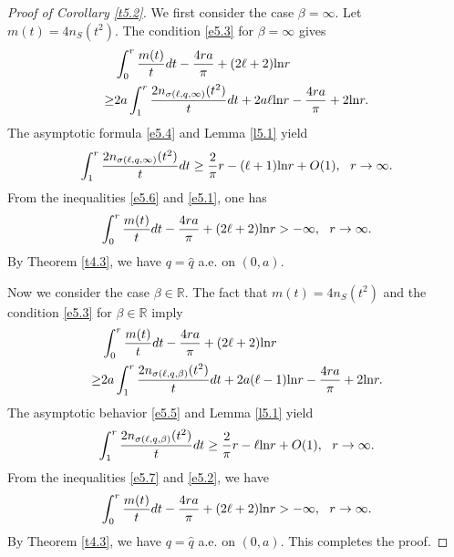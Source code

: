 \documentclass[reqno,12pt,centertags]{amsart}
\renewcommand{\ln}{\text{\rm ln}}
\numberwithin{equation}{section}
\theoremstyle{definition}
\begin{document}
\begin{proof}[Proof of Corollary \ref{t5.2}]
We first consider the case $\beta=\infty$. Let $m(t)=4n_S(t^2)$. The condition \eqref{e5.3} for $\beta=\infty$ gives  
\begin{equation}\label{e5.6}
\begin{split}
& \int_{0}^{r}\frac{m(t)}{t}dt
-\frac{4ra}{\pi}
+(2\ell+2)\ln r \\
\geq & 2a\int_{1}^{r} 
\frac{2n_{\sigma(\ell,q,\infty)}(t^2)}{t}dt
+2a\ell\ln r
-\frac{4ra}{\pi}+2\ln r.
\end{split}
\end{equation}
The asymptotic formula \eqref{e5.4} and Lemma \ref{l5.1} yield 
\begin{align}\label{e5.1}
\int_{1}^{r} \frac{2 n_{\sigma(\ell,q,\infty)}(t^2)}{t}dt 
\geq \frac{2}{\pi}r-(\ell+1)\ln r+O(1), 
~~r \rightarrow \infty.
\end{align}
From the inequalities \eqref{e5.6} and \eqref{e5.1}, one has 
\begin{equation*}
\int_{0}^{r}\frac{m(t)}{t}dt
-\frac{4ra}{\pi}
+(2\ell+2)\ln r >-\infty, 
~~r\rightarrow\infty.
\end{equation*}
By Theorem \ref{t4.3}, we have $q=\hat{q}$ a.e. on $(0,a)$. 

Now we consider the case $\beta\in\mathbb{R}$. The fact that $m(t)=4n_S(t^2)$ and the condition \eqref{e5.3} for $\beta\in\mathbb{R}$ imply   
\begin{equation}\label{e5.7}
\begin{split}
& \int_{0}^{r}\frac{m(t)}{t}dt
-\frac{4ra}{\pi}
+(2\ell+2)\ln r \\
\geq & 2a\int_{1}^{r} 
\frac{2n_{\sigma(\ell,q,\beta)}(t^2)}{t}dt
+2a(\ell-1)\ln r
-\frac{4ra}{\pi}+2\ln r.
\end{split}
\end{equation}
The asymptotic behavior \eqref{e5.5} and Lemma \ref{l5.1} yield 
\begin{align}\label{e5.2}
\int_{1}^{r} \frac{2 n_{\sigma(\ell,q,\beta)}(t^2)}{t}dt 
\geq \frac{2}{\pi}r-\ell\ln r+O(1), 
~~r \rightarrow \infty.
\end{align}
From the inequalities \eqref{e5.7} and \eqref{e5.2}, we have
\begin{equation*}
\int_{0}^{r}\frac{m(t)}{t}dt
-\frac{4ra}{\pi}
+(2\ell+2)\ln r  >-\infty, 
~~r\rightarrow\infty.
\end{equation*}
By Theorem \ref{t4.3}, we have $q=\hat{q}$ a.e. on $(0,a)$. This completes the proof.
\end{proof}
\end{document}
